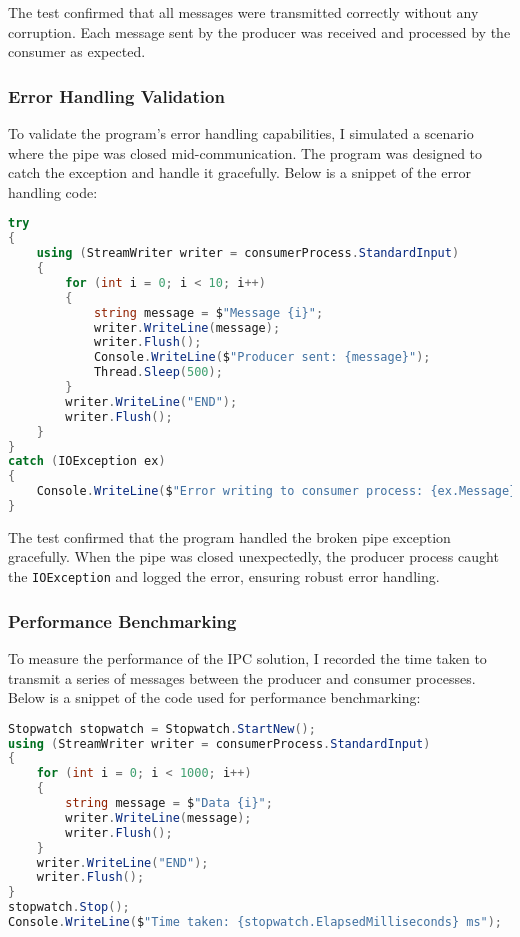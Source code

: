 \documentclass{article}
\begin{document}
The test confirmed that all messages were transmitted correctly without any corruption. Each message sent by the producer was received and processed by the consumer as expected.

\subsubsection*{Error Handling Validation}
To validate the program's error handling capabilities, I simulated a scenario where the pipe was closed mid-communication. The program was designed to catch the exception and handle it gracefully. Below is a snippet of the error handling code:

\begin{lstlisting}[language=C#]
try
{
    using (StreamWriter writer = consumerProcess.StandardInput)
    {
        for (int i = 0; i < 10; i++)
        {
            string message = $"Message {i}";
            writer.WriteLine(message);
            writer.Flush();
            Console.WriteLine($"Producer sent: {message}");
            Thread.Sleep(500);
        }
        writer.WriteLine("END");
        writer.Flush();
    }
}
catch (IOException ex)
{
    Console.WriteLine($"Error writing to consumer process: {ex.Message}");
}
\end{lstlisting}

The test confirmed that the program handled the broken pipe exception gracefully. When the pipe was closed unexpectedly, the producer process caught the \texttt{IOException} and logged the error, ensuring robust error handling.

\subsubsection*{Performance Benchmarking}
To measure the performance of the IPC solution, I recorded the time taken to transmit a series of messages between the producer and consumer processes. Below is a snippet of the code used for performance benchmarking:

\begin{lstlisting}[language=C#]
Stopwatch stopwatch = Stopwatch.StartNew();
using (StreamWriter writer = consumerProcess.StandardInput)
{
    for (int i = 0; i < 1000; i++)
    {
        string message = $"Data {i}";
        writer.WriteLine(message);
        writer.Flush();
    }
    writer.WriteLine("END");
    writer.Flush();
}
stopwatch.Stop();
Console.WriteLine($"Time taken: {stopwatch.ElapsedMilliseconds} ms");
\end{lstlisting}
\end{document}
